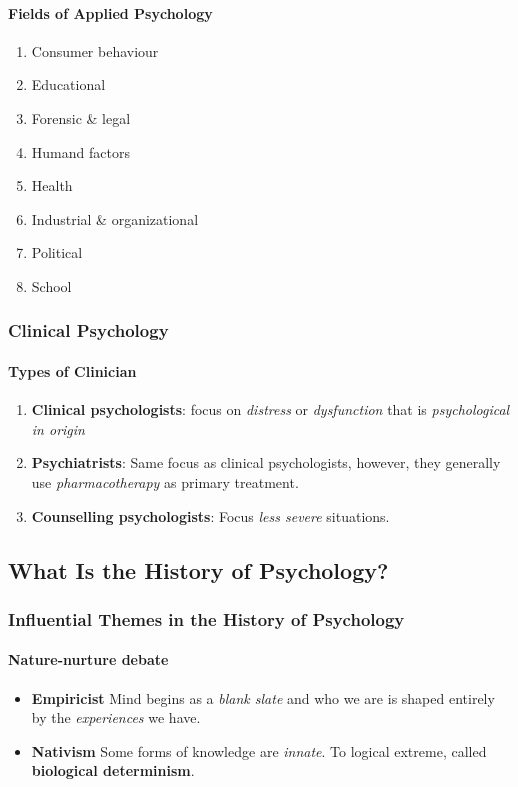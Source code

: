 \documentclass{article}
\begin{document}
 	\paragraph{Fields of Applied Psychology}
 	\begin{enumerate}
 		\item Consumer behaviour
 		\item Educational
 		\item Forensic \& legal
 		\item Humand factors
 		\item Health
 		\item Industrial \& organizational
 		\item Political
 		\item School
 	\end{enumerate}
 	\subsubsection{Clinical Psychology}
 	\paragraph{Types of Clinician}
 	\begin{enumerate}
 		\item \textbf{Clinical psychologists}: focus on \emph{distress} or \emph{dysfunction} that is \emph{psychological in origin}
 		\item \textbf{Psychiatrists}: Same focus as clinical psychologists, however, they generally use \emph{pharmacotherapy} as primary treatment.
 		\item \textbf{Counselling psychologists}: Focus \emph{less severe} situations.
 	\end{enumerate}
 	\subsection{What Is the History of Psychology?}
 	\subsubsection{Influential Themes in the History of Psychology}
 	\paragraph{Nature-nurture debate}
 	\begin{itemize}
 		\item \textbf{Empiricist} Mind begins as a \emph{blank slate} and who we are is shaped entirely by the \emph{experiences} we have.
 		\item \textbf{Nativism} Some forms of knowledge are \emph{innate}. To logical extreme, called \textbf{biological determinism}.
 	\end{itemize}
\end{document}
